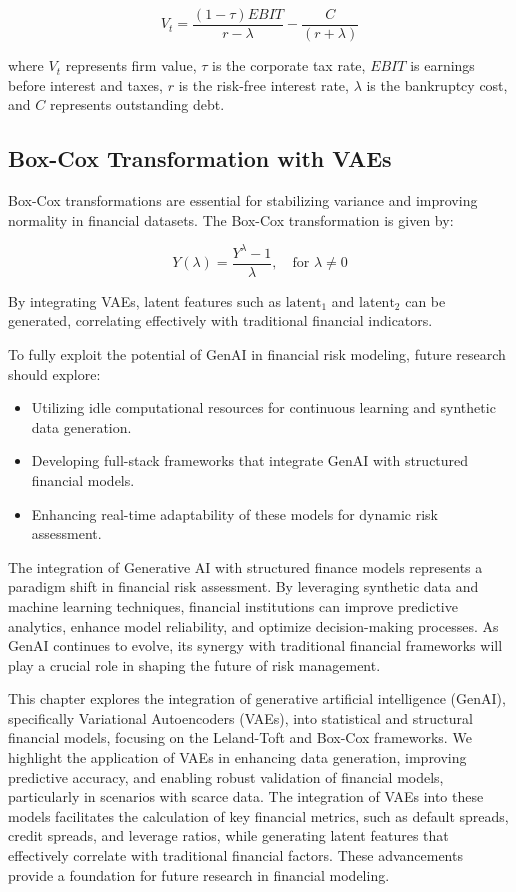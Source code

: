 \documentclass[a4paper,headinclude=on,footinclude=on,12pt,oneside]{scrbook}
\begin{document}
	\begin{equation}
		V_t = \frac{(1 - \tau) EBIT}{r - \lambda} - \frac{C}{(r + \lambda)}
	\end{equation}
	
	where $V_t$ represents firm value, $\tau$ is the corporate tax rate, $EBIT$ is earnings before interest and taxes, $r$ is the risk-free interest rate, $\lambda$ is the bankruptcy cost, and $C$ represents outstanding debt.
	
	\subsection{Box-Cox Transformation with VAEs}
	Box-Cox transformations are essential for stabilizing variance and improving normality in financial datasets. The Box-Cox transformation is given by:
	
	\begin{equation}
		Y(\lambda) = \frac{Y^{\lambda} - 1}{\lambda}, \quad \text{for } \lambda \neq 0
	\end{equation}
	
	By integrating VAEs, latent features such as $\text{latent}_1$ and $\text{latent}_2$ can be generated, correlating effectively with traditional financial indicators.
	
	To fully exploit the potential of GenAI in financial risk modeling, future research should explore:
	\begin{itemize}
		\item Utilizing idle computational resources for continuous learning and synthetic data generation.
		\item Developing full-stack frameworks that integrate GenAI with structured financial models.
		\item Enhancing real-time adaptability of these models for dynamic risk assessment.
	\end{itemize}
	
	The integration of Generative AI with structured finance models represents a paradigm shift in financial risk assessment. By leveraging synthetic data and machine learning techniques, financial institutions can improve predictive analytics, enhance model reliability, and optimize decision-making processes. As GenAI continues to evolve, its synergy with traditional financial frameworks will play a crucial role in shaping the future of risk management.
	
	
	This chapter explores the integration of generative artificial intelligence (GenAI), specifically Variational Autoencoders (VAEs), into statistical and structural financial models, focusing on the Leland-Toft and Box-Cox frameworks. We highlight the application of VAEs in enhancing data generation, improving predictive accuracy, and enabling robust validation of financial models, particularly in scenarios with scarce data. The integration of VAEs into these models facilitates the calculation of key financial metrics, such as default spreads, credit spreads, and leverage ratios, while generating latent features that effectively correlate with traditional financial factors. These advancements provide a foundation for future research in financial modeling.
	
\end{document}

